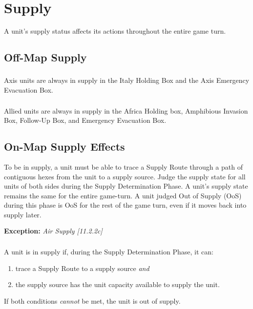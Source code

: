 \section{Supply}
A unit's supply status affects its actions throughout the entire game turn.

\subsection{Off-Map Supply}
\subsubsection{}
Axis units are always in supply in the Italy Holding Box and the Axis Emergency Evacuation Box.

\subsubsection{
}Allied units are always in supply in the Africa Holding box, Amphibious Invasion Box, Follow-Up Box, and Emergency Evacuation Box.

\subsection{On-Map Supply Effects}
To be in supply, a unit must be able to trace a Supply Route through a path of contiguous hexes from the unit to a supply source. Judge the supply state for all units of both sides during the Supply Determination Phase. A unit's supply state remains the same for the entire game-turn. A unit judged Out of Supply (OoS) during this phase is OoS for the rest of the game turn, even if it moves back into supply later.

\textbf{Exception:} \textit{Air Supply [11.2.2c]}

\subsubsection{}
A unit is in supply if, during the Supply Determination Phase, it can:

\begin{enumerate}[label=\alph*.]
    \item trace a Supply Route to a supply source \textit{and}
    \item the supply source has the unit capacity available to supply the unit.
\end{enumerate}

If both conditions \textit{cannot} be met, the unit is out of supply.

